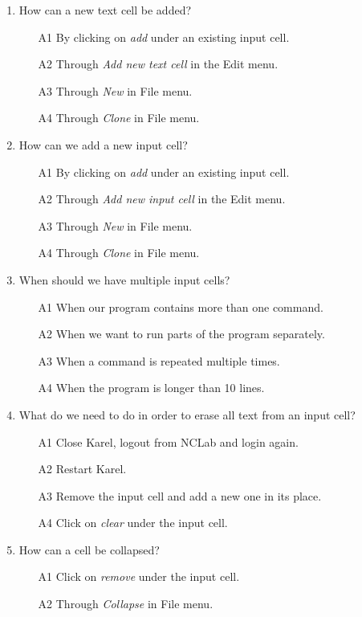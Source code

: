 \documentclass[article,A4,12pt]{llncs}
\begin{document}
{{{{\begin{enumerate}
\item How can a new text cell be added?
\begin{enumerate}
\item[A1] By clicking on {\em add} under an existing input cell.
\item[A2] Through {\em Add new text cell} in the Edit menu.
\item[A3] Through {\em New} in File menu.
\item[A4] Through {\em Clone} in File menu.
\end{enumerate}
\item How can we add a new input cell?
\begin{enumerate}
\item[A1] By clicking on {\em add} under an existing input cell.
\item[A2] Through {\em Add new input cell} in the Edit menu.
\item[A3] Through {\em New} in File menu.
\item[A4] Through {\em Clone} in File menu.
\end{enumerate}
\item When should we have multiple input cells?
\begin{enumerate}
\item[A1] When our program contains more than one command.
\item[A2] When we want to run parts of the program separately.
\item[A3] When a command is repeated multiple times.
\item[A4] When the program is longer than 10 lines.
\end{enumerate}
\item What do we need to do in order to erase all text from an input cell?
\begin{enumerate}
\item[A1] Close Karel, logout from NCLab and login again. 
\item[A2] Restart Karel.
\item[A3] Remove the input cell and add a new one in its place.
\item[A4] Click on {\em clear} under the input cell.
\end{enumerate}
\item How can a cell be collapsed?
\begin{enumerate}
\item[A1] Click on {\em remove} under the input cell.
\item[A2] Through {\em Collapse} in File menu.

\end{enumerate}
\end{enumerate}}}}}
\end{document}
